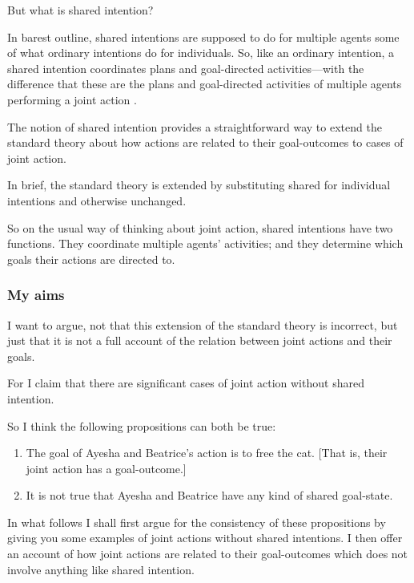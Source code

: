 \documentclass[12pt,a4paper]{extarticle}
\begin{document}
But what is shared intention?

In barest outline, shared intentions are supposed to do for multiple agents some of what ordinary intentions do for individuals.  So, like an ordinary intention, a shared intention coordinates plans and goal-directed activities---with the difference that these are the plans and goal-directed activities of multiple agents performing a joint action \citep{Bratman:1993je}.

The notion of shared intention provides a straightforward way to extend the standard theory about how actions are related to their goal-outcomes to cases of joint action.

In brief, the standard theory is extended by substituting shared for individual intentions and otherwise unchanged.  

So on the usual way of thinking about joint action, shared intentions have two functions.  They coordinate multiple agents' activities; and they determine which goals their actions are directed to.


\subsubsection{My aims}
I want to argue, not that this extension of the standard theory is incorrect, but just that it is not a full account of the relation between joint actions and their goals.

For I claim that there are significant cases of joint action without shared intention.

So I think the following propositions can both be true:

\begin{enumerate}

\item The goal of Ayesha and Beatrice's action is to free the cat.  [That is, their joint action has a goal-outcome.]

\item It is not true that Ayesha and Beatrice have any kind of  shared goal-state.  

\end{enumerate}

In what follows I shall first argue for the consistency of these propositions by giving you some examples of joint actions without shared intentions.  I then offer an account of how joint actions are related to their goal-outcomes which does not involve anything like shared intention.  
\end{document}
